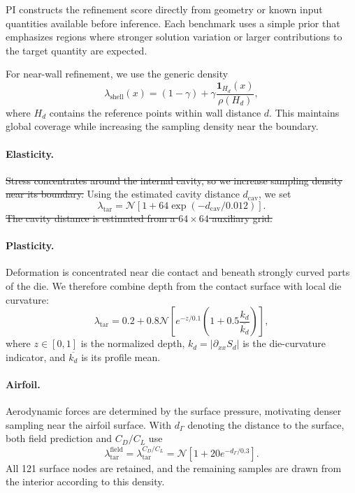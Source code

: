 \documentclass{article}
\providecommand{\DIFdeltex}[1]{{\protect\color{red}\sout{#1}}}                      %
\providecommand{\DIFdelbegin}{} %
\providecommand{\DIFdelend}{} %
\providecommand{\DIFdel}[1]{\texorpdfstring{\DIFdeltex{#1}}{}} %
\newcommand{\DIFscaledelfig}{0.5}
\newlength{\DIFdelgraphicswidth} %
\newlength{\DIFdelgraphicsheight} %
\newcommand{\DIFdelincludegraphics}[2][]{%
\sbox{\DIFdelgraphicsbox}{\DIFOincludegraphics[#1]{#2}}%
\settoboxwidth{\DIFdelgraphicswidth}{\DIFdelgraphicsbox} %
\settoboxtotalheight{\DIFdelgraphicsheight}{\DIFdelgraphicsbox} %
\scalebox{\DIFscaledelfig}{%
\parbox[b]{\DIFdelgraphicswidth}{\usebox{\DIFdelgraphicsbox}\\[-\baselineskip] \rule{\DIFdelgraphicswidth}{0em}}\llap{\resizebox{\DIFdelgraphicswidth}{\DIFdelgraphicsheight}{%
\setlength{\unitlength}{\DIFdelgraphicswidth}%
\begin{picture}(1,1)%
\thicklines\linethickness{2pt} %
{\color[rgb]{1,0,0}\put(0,0){\framebox(1,1){}}}%
{\color[rgb]{1,0,0}\put(0,0){\line( 1,1){1}}}%
{\color[rgb]{1,0,0}\put(0,1){\line(1,-1){1}}}%
\end{picture}%
}\hspace*{3pt}}} %
} %
\DeclareRobustCommand{\DIFdelbegin}{\DIFOdelbegin \let\includegraphics\DIFdelincludegraphics} %
\DeclareRobustCommand{\DIFdelend}{\DIFOaddend \let\includegraphics\DIFOincludegraphics} %
\begin{document}
PI constructs the refinement score directly from geometry or known input
quantities available before inference. Each benchmark uses a simple prior that
emphasizes regions where stronger solution variation or larger contributions to
the target quantity are expected.

For near-wall refinement, we use the generic density
\begin{equation}
    \lambda_{\mathrm{shell}}(x)
    =(1-\gamma)
    +\gamma\frac{\mathbf{1}_{H_d}(x)}{\rho(H_d)},
    \label{eq:app_density_shell}
\end{equation}
where $H_d$ contains the reference points within wall distance $d$. This
maintains global coverage while increasing the sampling density near the
boundary.

\paragraph{Elasticity.}
\DIFdelbegin \DIFdel{Stress concentrates around the internal cavity, so we increase sampling density
near its boundary. }\DIFdelend Using the estimated cavity distance $d_{\mathrm{cav}}$, we set
\begin{equation}
    \lambda_{\mathrm{tar}}
    =\mathcal{N}\!\left[
        1+64\exp(-d_{\mathrm{cav}}/0.012)
    \right].
    \label{eq:app_pi_elasticity_density}
\end{equation}
\DIFdelbegin \DIFdel{The cavity distance is estimated from a $64\times64$ auxiliary grid.
}\DIFdelend 

\paragraph{Plasticity.}
Deformation is concentrated near die contact and beneath strongly curved parts
of the die. We therefore combine depth from the contact surface with local die
curvature:
\begin{equation}
    \lambda_{\mathrm{tar}}
    =0.2+0.8\mathcal{N}\!\left[
        e^{-z/0.1}
        \left(1+0.5\frac{k_d}{\overline{k_d}}\right)
    \right],
    \label{eq:app_pi_plasticity_density}
\end{equation}
where $z\in[0,1]$ is the normalized depth,
$k_d=|\partial_{xx}S_d|$ is the die-curvature indicator, and
$\overline{k_d}$ is its profile mean.

\paragraph{Airfoil.}
Aerodynamic forces are determined by the surface pressure, motivating denser
sampling near the airfoil surface. With $d_\Gamma$ denoting the distance to the
surface, both field prediction and $C_D/C_L$ use
\begin{equation}
    \lambda_{\mathrm{tar}}^{\mathrm{field}}
    =\lambda_{\mathrm{tar}}^{C_D/C_L}
    =\mathcal{N}\!\left[
        1+20e^{-d_\Gamma/0.3}
    \right].
    \label{eq:app_pi_airfoil_density}
\end{equation}
All 121 surface nodes are retained, and the remaining samples are drawn from
the interior according to this density.
\end{document}
